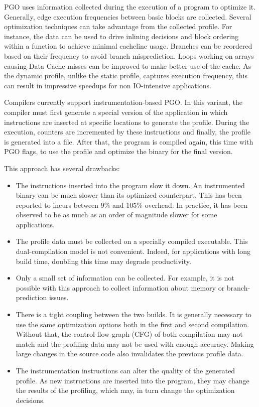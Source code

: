 \documentclass[9pt,english,twocolumn,letter]{article}
\begin{document}
PGO uses information collected during the execution of a program to optimize it. Generally, edge execution frequencies between basic blocks are collected. Several optimization techniques can take advantage from the collected profile.  For instance, the data can be used to drive inlining decisions and block ordering within a function to achieve minimal cacheline usage. Branches can be reordered based on their frequency to avoid branch misprediction. Loops working on arrays causing Data Cache misses can be improved to make better use of the cache. As the dynamic profile, unlike the static profile, captures execution frequency, this can result in impressive speedups for non IO-intensive applications.

Compilers currently support instrumentation-based PGO. In this variant, the compiler must first generate a special version of the application in which instructions are inserted at specific locations to generate the profile. During the execution, counters are incremented by these instructions and finally, the profile is generated into a file. After that, the program is compiled again, this time with PGO flags, to use the profile and optimize the binary for the final version.

This approach has several drawbacks:

\begin{itemize}
    \item The instructions inserted into the program slow it down. An instrumented binary can be much slower than its optimized counterpart. This has been reported to incurs between 9\% and 105\% overhead\cite{Ball94,Ball96}. In practice, it has been observed to be as much as an order of magnitude slower for some applications.
    \item The profile data must be collected on a specially compiled executable. This dual-compilation model is not convenient. Indeed, for applications with long build time, doubling this time may degrade productivity.
    \item Only a small set of information can be collected. For example, it is not possible with this approach to collect information about memory or branch-prediction issues.
    \item There is a tight coupling between the two builds. It is generally necessary to use the same optimization options both in the first and second compilation. Without that, the control-flow graph (CFG) of both compilation may not match and the profiling data may not be used with enough accuracy. Making large changes in the source code also invalidates the previous profile data.
    \item The instrumentation instructions can alter the quality of the generated profile. As new instructions are inserted into the program, they may change the results of the profiling, which may, in turn change the optimization decisions.
\end{itemize}
\end{document}
